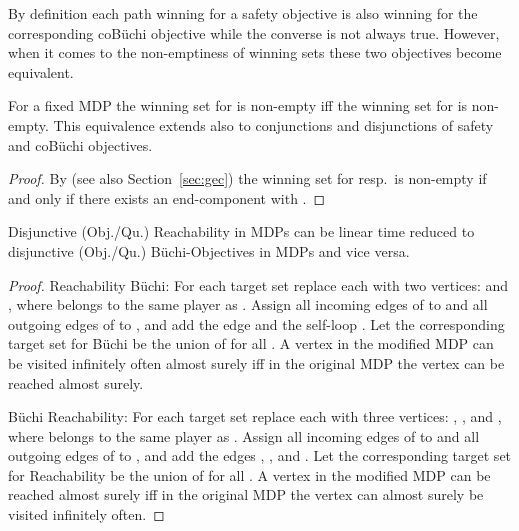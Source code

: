 \documentclass[11pt,letterpaper]{article}
\newcommand{\lu}{\textup{(}}
\newcommand{\ru}{\textup{)}\xspace}
\newcommand{\upbr}[1]{\lu #1\ru}
\newif\iffullversion
\newcommand{\infull}[1]{\iffullversion #1\fi}
\begin{document}
{By definition each path winning for a safety objective 
is also winning
for the corresponding coBüchi objective while the converse is not always true.
However, when it comes to the non-emptiness of winning sets these two objectives become equivalent.

\begin{observation}\label{obs:nonempty_safety_coBuchi}
	For a fixed MDP  the winning set for  is non-empty
	iff the winning set for  is non-empty.
	This equivalence extends also to conjunctions and disjunctions of safety and coBüchi objectives.
\end{observation}
\begin{proof}
	By \cite[p.~891]{CourcoubetisY95} (see also Section~\ref{sec:gec})
	the winning set for  resp.\ 
	is non-empty if and only if there exists an end-component  with .
\end{proof}

\begin{observation}\label{obs:Reachability_Buchi}
	Disjunctive \upbr{Obj./Qu.} Reachability in MDPs can be linear time reduced to 
	disjunctive \upbr{Obj./Qu.} Büchi-Objectives in MDPs and vice versa.
\end{observation}
\begin{proof}
	Reachability  Büchi: For each target set  
	replace each  with two vertices:  and 
	, where  belongs to the same player as .
	Assign all incoming edges of  to 
	and all outgoing edges of  to , and add the edge  and the self-loop . Let the 
	corresponding target set for Büchi be the union of  for all 
	. A vertex  in the modified MDP can be visited 
	infinitely often  almost surely iff in the original MDP the vertex  can be
	reached almost surely.
	
	Büchi  Reachability: For each target set  
	replace each  with three vertices: ,
	, and , where  belongs to the 
	same player as . Assign all incoming edges of  to 
	and all outgoing edges of  to , and add the edges 
	, , and .
	Let the corresponding target set for Reachability be the union of  for all 
	. A vertex  in the modified MDP can be reached almost 
	surely iff in the original MDP the vertex  can almost surely
	be visited infinitely often.
\end{proof}

}

\infull{
\begin{observation}\label{obs:ConjBuchiStreet}
	Conjunctive Büchi \upbr{resp.\ coBüchi} objectives are special instances of Streett objectives.
\end{observation}
\begin{proof}
	For Büchi let  and , for coBüchi let 
	and .
\end{proof}

\begin{observation}\label{obs:DisjBuchiRabin}
	Disjunctive Büchi \upbr{resp.\ coBüchi} objectives are special instances of Rabin objectives.
\end{observation}
\begin{proof}
	For Büchi let  and , for coBüchi let 
	 and .
\end{proof}
}
\end{document}
